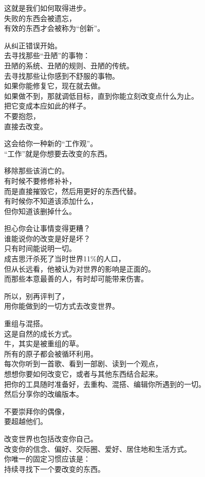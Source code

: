 \documentclass[
]{article}
\begin{document}
这就是我们如何取得进步。\\
失败的东西会被遗忘，\\
有效的东西才会被称为``创新''。

从纠正错误开始。\\
去寻找那些``丑陋''的事物：\\
丑陋的系统、丑陋的规则、丑陋的传统。\\
去寻找那些让你感到不舒服的事物。\\
如果你能修复它，现在就去做。\\
如果做不到，那就调低目标，直到你能立刻改变点什么为止。\\
把它变成本应如此的样子。\\
不要抱怨，\\
直接去改变。

这会给你一种新的``工作观''。\\
``工作''就是你想要去改变的东西。

移除那些该消亡的。\\
有时候不要修修补补，\\
而是直接摧毁它，然后用更好的东西代替。\\
有时候你不知道该添加什么，\\
但你知道该删掉什么。

担心你会让事情变得更糟？\\
谁能说你的改变是好是坏？\\
只有时间能说明一切。\\
成吉思汗杀死了当时世界11\%的人口，\\
但从长远看，他被认为对世界的影响是正面的。\\
而那些本意最善的人，有时却可能带来伤害。

所以，别再评判了，\\
用你能做到的一切方式去改变世界。

重组与混搭。\\
这是自然的成长方式。\\
牛，其实是被重组的草。\\
所有的原子都会被循环利用。\\
每次你听到一首歌、看到一部剧、读到一个观点，\\
想想你要如何改变它，或者与其他东西结合起来。\\
把你的工具随时准备好，去重构、混搭、编辑你所遇到的一切。\\
然后分享你的改编版本。

不要崇拜你的偶像，\\
要超越他们。

改变世界也包括改变你自己。\\
改变你的信念、偏好、交际圈、爱好、居住地和生活方式。\\
你唯一的固定习惯应该是：\\
持续寻找下一个要改变的东西。
\end{document}
